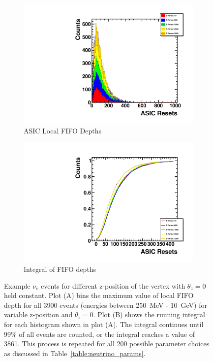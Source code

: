 \begin{figure}
\centering
\begin{subfigure}{.5\textwidth}
  \centering
  \includegraphics[width=\textwidth]{images/Const_Theta0_ASIC_stack_integral_pdg12_fhc.pdf}
  \caption{ASIC Local FIFO Depths}
\end{subfigure}%
\begin{subfigure}{.5\textwidth}
  \centering
  \includegraphics[width=\textwidth]{images/Const_Theta0_ASIC_integral_pdg12_fhc.pdf}
  \caption{Integral of FIFO depths}
\end{subfigure}
\caption{Example $\nu_{e}$ events for different z-position of the vertex with $\theta_{z} = 0$ held constant.
Plot (A) bins the maximum value of local FIFO depth for all 3900 events (energies between 250~\unit{MeV} - 10~\unit{GeV}) for variable z-position and $\theta_{z} = 0$.
Plot (B) shows the running integral for each histogram shown in plot (A).
The integral continues until 99\% of all events are counted, or the integral reaches a value of 3861.
This process is repeated for all 200 possible parameter choices as discussed in Table~\ref{table:neutrino_params}.
}
\label{fig:example_asic_integral_value_constTheta}
\end{figure}


